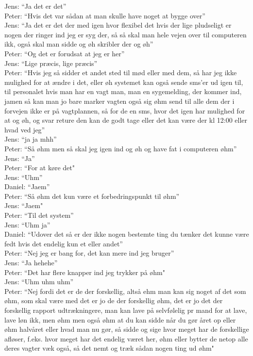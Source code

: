 Jens: “Ja det er det”\\
Peter: “Hvis det var sådan at man skulle have noget at bygge over”\\
Jens: “Ja det er det der med igen hvor flexibel det hvis der lige pludseligt er nogen der ringer ind jeg er syg der, så så skal man hele vejen over til computeren ikk, også skal man sidde og øh skribler der og øh”\\
Peter: “Og det er forudsat at jeg er her”\\
Jens: “Lige præcis, lige præcis”\\
Peter: “Hvis jeg så sidder et andet sted til mød eller med dem, så har jeg ikke mulighed for at ændre i det, eller øh systemet kan også sende sms’er ud igen til, til personalet hvis man har en vagt man, man en sygemelding, der kommer ind, jamen så kan man jo bare marker vagten også sig øhm send til alle dem der i forvejen ikke er på vagtplannen, så for de en sms, hvor det igen har mulighed for at og øh, og svar reture den kan de godt tage eller det kan være der kl 12:00 eller hvad ved jeg”\\
Jens: “ja ja mhh”\\
Peter: “Så øhm men så skal jeg igen ind og øh og have fat i computeren øhm”\\
Jens: “Ja”\\
Peter: “For at køre det"\\
Jens: “Uhm”\\
Daniel: “Jaem”\\
Peter: “Så øhm det kun være et forbedringspunkt til øhm”\\
Jens: “Jaem"\\
Peter: “Til det system”\\
Jens: “Uhm ja”\\
Daniel: “Udover det så er der ikke nogen bestemte ting du tænker det kunne være fedt hvis det endelig kun et eller andet”\\
Peter: “Nej jeg er bang for, det kan mere ind jeg bruger”\\
Jens: “Ja hehehe”\\
Peter: “Det har flere knapper ind jeg trykker på øhm"\\
Jens: “Uhm uhm uhm”\\
Peter: “Nej fordi det er de der forskellig, altså ehm man kan sig noget af det som øhm, som skal være med det er jo de der forskellig øhm, det er jo det der forskellig rapport udtrækningere, man kan lave på selvfølelig pr mand for at lave, lave løn ikk, men øhm men også øhm at du kan sidde når du gør året op eller øhm halvåret eller hvad man nu gør, så sidde og sige hvor meget har de forskellige afløser, f.eks. hvor meget har det endelig været her, øhm eller bytter de netop alle deres vagter væk også, så det nemt og træk sådan nogen  ting ud øhm"\\
